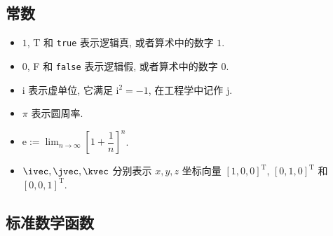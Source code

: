 \subsection*{常数}



\begin{itemize}
    \item $1$, T 和 \lstinline|true| 表示逻辑真, 或者算术中的数字 $1$.
    \item $0$, F 和 \lstinline|false| 表示逻辑假, 或者算术中的数字 $0$.
    \item $\mathrm{i}$ 表示虚单位, 它满足 $\mathrm{i}^2 = -1$, 在工程学中记作 $\mathrm{j}$.
    \item $\pi$ 表示圆周率.
    \item $\mathrm{e} := \lim_{n \to \infty} \left[ 1 + \dfrac{1}{n} \right]^n$.
    \item $\ivec, \jvec, \kvec$ 分别表示 $x, y, z$ 坐标向量
    $[1, 0, 0]^\mathrm{T}$, $[0, 1, 0]^\mathrm{T}$ 和 $[0, 0, 1]^\mathrm{T}$.
\end{itemize}

\subsection*{标准数学函数}



